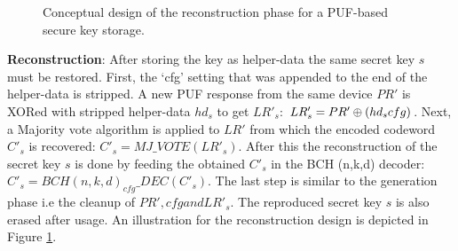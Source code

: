 \begin{figure}[htp]
\centering
{}
\caption{Conceptual design of the reconstruction phase for a PUF-based secure key storage.}
\label{img:fz_3}
\end{figure}

\textbf{Reconstruction}: After storing the key as helper-data the same secret key $s$ must be restored. First, the `cfg' setting that was appended to the end of the helper-data is stripped. A new PUF response from the same device $PR'$ is XORed with stripped helper-data $hd_s$ to get $LR'_s$: $LR'_s = PR' \mathbin{\oplus} (hd_s\\cfg)$. Next, a Majority vote algorithm is applied to $LR'$ from which the encoded codeword $C'_s$ is recovered: $C'_s = MJ\_VOTE(LR'_s)$. After this the
reconstruction of the secret key $s$ is done by feeding the obtained $C'_s$ in the BCH (n,k,d) decoder: $C'_s = BCH(n,k,d)_{cfg}\_DEC(C'_s)$. The last step is similar to the generation phase i.e the cleanup of $PR', cfg and LR'_s$. The reproduced secret key $s$ is also erased after usage. An illustration for the reconstruction design is depicted in Figure \ref{img:fz_3}.

